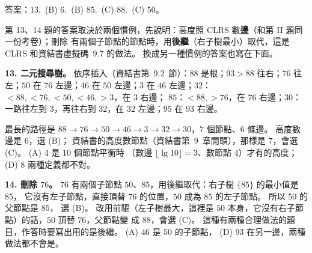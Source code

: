 \begin{pastsoln}
答案：13.~(B) 6.~(B) 85.~(C) 88.~(C) 50。

第 13、14 題的答案取決於兩個慣例，先說明：高度照 CLRS 數\textbf{邊}（和第 II 題同一份考卷）；刪除
有兩個子節點的節點時，用\textbf{後繼}（右子樹最小）取代，這是 CLRS 和資結書虛擬碼~9.7 的做法。
換成另一種慣例的答案也寫在下面。

\textbf{13. 二元搜尋樹。} 依序插入（資結書第~9.2~節）：$88$ 是根；$93 > 88$ 往右；$76$ 往左；$50$ 在
$76$ 左邊；$46$ 在 $50$ 左邊；$3$ 在 $46$ 左邊；$32$：$< 88, < 76, < 50, < 46, > 3$，在 $3$ 右邊；
$85$：$< 88, > 76$，在 $76$ 右邊；$30$：一路往左到 $3$，再往右到 $32$，在 $32$ 左邊；$95$ 在 $93$
右邊。
\begin{center}
\end{center}
最長的路徑是 $88 \to 76 \to 50 \to 46 \to 3 \to 32 \to 30$，$7$ 個節點、$6$ 條邊。 高度數邊是 $6$，選 (B)；
資結書的高度數節點（資結書第~9~章開頭），那樣是 $7$，會選 (C)。 (A) 4 是 $10$ 個節點平衡時
（數邊 $\lfloor \lg 10 \rfloor = 3$、數節點 $4$）才有的高度；(D) 8 兩種定義都不對。

\textbf{14. 刪除 $76$。} $76$ 有兩個子節點 $50$、$85$，用後繼取代：右子樹 $\{85\}$ 的最小值是 $85$，
它沒有左子節點，直接頂替 $76$ 的位置，$50$ 成為 $85$ 的左子節點。 所以 $50$ 的父節點是 $85$，
選 (B)。 改用前驅（左子樹最大，這裡是 $50$ 本身，它沒有右子節點）的話，$50$ 頂替 $76$，父節點變
成 $88$，會選 (C)。 這種有兩種合理做法的題目，作答時要寫出用的是後繼。 (A) 46 是 $50$ 的子節點，
(D) 93 在另一邊，兩種做法都不會是。


\end{pastsoln}

